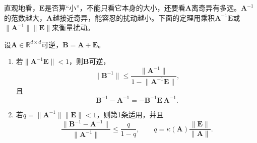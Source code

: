 直观地看，$\bm E$是否算“小”，不能只看它本身的大小，还要看$\bm A$离奇异有多远。$\bm A^{-1}$的范数越大，$\bm A$越接近奇异，能容忍的扰动越小。下面的定理用乘积$\bm A^{-1}\bm E$或$\lVert\bm A^{-1}\rVert\lVert\bm E\rVert$来衡量扰动。

\begin{theorem}[逆矩阵的有限扰动]
\label{thm:ls-inverse-finite-perturbation}
设$\bm A\in\mathbb R^{d\times d}$可逆，$\bm B=\bm A+\bm E$。
\begin{enumerate}
 \item 若$\lVert\bm A^{-1}\bm E\rVert<1$，则$\bm B$可逆，
 \begin{equation}
  \lVert\bm B^{-1}\rVert\leq\frac{\lVert\bm A^{-1}\rVert}{1-\lVert\bm A^{-1}\bm E\rVert},
  \label{eq:ls-inverse-norm-bound}
 \end{equation}
 且
 \begin{equation}
  \bm B^{-1}-\bm A^{-1}=-\bm B^{-1}\bm E\,\bm A^{-1}.
  \label{eq:ch06-inverse-finite-perturbation}
 \end{equation}
 \item 若$q=\lVert\bm A^{-1}\rVert\lVert\bm E\rVert<1$，则第1条适用，并且
 \begin{equation}
  \frac{\lVert\bm B^{-1}-\bm A^{-1}\rVert}{\lVert\bm A^{-1}\rVert}
  \leq\frac{q}{1-q},\qquad q=\kappa(\bm A)\frac{\lVert\bm E\rVert}{\lVert\bm A\rVert}.
  \label{eq:ls-inverse-relative-perturbation-bound}
 \end{equation}
\end{enumerate}
\end{theorem}
